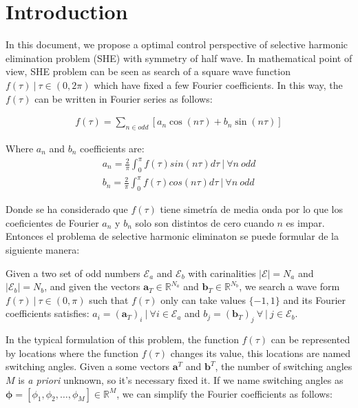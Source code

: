 \chapter{Introduction}

In this document, we propose  a optimal control  perspective of selective harmonic elimination problem (SHE) with symmetry of half wave. 
%
In mathematical point of view, SHE problem can be seen as search of a square wave function  $f(\tau ) \ | \ \tau \in (0,2\pi)$ which have fixed a few Fourier coefficients. 
\newline
%
In this way, the $f(\tau)$ can be written in Fourier series as follows:

\begin{gather}
    f(\tau ) = \sum_{n \in odd} [a_n \cos(n\tau) + b_n \sin(n \tau)] 
\end{gather}

Where $a_n$ and $b_n$ coefficients are:
\begin{gather}
    a_n = \frac{2}{\pi} \int_0^\pi f(\tau ) sin(n \tau)d\tau \ | \ \forall n \ odd\\
    b_n = \frac{2}{\pi} \int_0^\pi f(\tau) cos(n \tau) d\tau \ | \ \forall n \ odd
\end{gather}


Donde se ha considerado que $f(\tau)$ tiene simetría de media onda por lo que  los coeficientes de Fourier $a_n$ y $b_n$ solo son distintos de cero cuando $n$ es impar. Entonces el problema de selective harmonic eliminaton se puede formular de la siguiente manera:

\begin{problem}\label{SHEp}
    Given  a two set of odd numbers $\mathcal{E}_a$ and $\mathcal{E}_b$ with carinalities $|\mathcal{E}| = N_a$ and  $|\mathcal{E}_b| = N_b$, and given the vectors $\bm{a}_T  \in \mathbb{R}^{N_a}$ and $\bm{b}_T  \in \mathbb{R}^{N_b}$, we search a wave form $f(\tau ) \ | \ \tau \in (0,\pi)$ such that $f(\tau)$ only can take values  $\{-1,1\}$ and its Fourier coefficients satisfies: $ a_i = (\bm{a}_T)_i \ | \ \forall i \in \mathcal{E}_a$ and  $b_j = (\bm{b}_T)_j \ \forall \ | \  j \in \mathcal{E}_b$. 
\end{problem}



In the typical formulation of this problem, the function $f(\tau)$ can be represented by locations  where the function $f(\tau)$ changes its value, this locations are named switching angles.
%
Given a some vectors $\bm{a}^T$ and $\bm{b}^T$, the number of switching angles $M$ is \emph{a priori} unknown, so it's necessary fixed it. If we name switching angles as $\bm{\phi} = [\phi_1,\phi_2,\dots,\phi_M] \in \mathbb{R}^M $, we can simplify the Fourier coefficients as follows:

